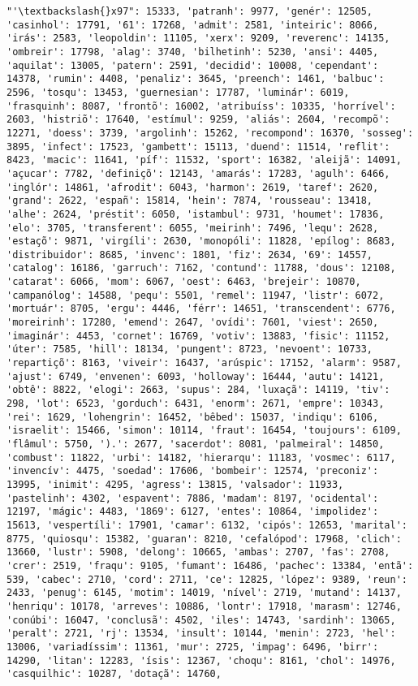 \begin{Verbatim}[commandchars=\\\{\}]
"'\textbackslash{}x97": 15333, 'patranh': 9977, 'genér': 12505, 'casinhol': 17791, '61': 17268, 'admit': 2581, 'inteiric': 8066, 'irás': 2583, 'leopoldin': 11105, 'xerx': 9209, 'reverenc': 14135, 'ombreir': 17798, 'alag': 3740, 'bilhetinh': 5230, 'ansi': 4405, 'aquilat': 13005, 'patern': 2591, 'decidid': 10008, 'cependant': 14378, 'rumin': 4408, 'penaliz': 3645, 'preench': 1461, 'balbuc': 2596, 'tosqu': 13453, 'guernesian': 17787, 'luminár': 6019, 'frasquinh': 8087, 'frontõ': 16002, 'atribuíss': 10335, 'horrível': 2603, 'histriõ': 17640, 'estímul': 9259, 'aliás': 2604, 'recompõ': 12271, 'doess': 3739, 'argolinh': 15262, 'recompond': 16370, 'sosseg': 3895, 'infect': 17523, 'gambett': 15113, 'duend': 11514, 'reflit': 8423, 'macic': 11641, 'píf': 11532, 'sport': 16382, 'aleijã': 14091, 'açucar': 7782, 'definiçõ': 12143, 'amarás': 17283, 'agulh': 6466, 'inglór': 14861, 'afrodit': 6043, 'harmon': 2619, 'taref': 2620, 'grand': 2622, 'españ': 15814, 'hein': 7874, 'rousseau': 13418, 'alhe': 2624, 'préstit': 6050, 'istambul': 9731, 'houmet': 17836, 'elo': 3705, 'transferent': 6055, 'meirinh': 7496, 'lequ': 2628, 'estaçõ': 9871, 'virgíli': 2630, 'monopóli': 11828, 'epílog': 8683, 'distribuidor': 8685, 'invenc': 1801, 'fiz': 2634, '69': 14557, 'catalog': 16186, 'garruch': 7162, 'contund': 11788, 'dous': 12108, 'catarat': 6066, 'mom': 6067, 'oest': 6463, 'brejeir': 10870, 'campanólog': 14588, 'pequ': 5501, 'remel': 11947, 'listr': 6072, 'mortuár': 8705, 'ergu': 4446, 'férr': 14651, 'transcendent': 6776, 'moreirinh': 17280, 'emend': 2647, 'ovídi': 7601, 'viest': 2650, 'imaginár': 4453, 'cornet': 16769, 'votiv': 13883, 'fisic': 11152, 'úter': 7585, 'hill': 18134, 'pungent': 8723, 'nevoent': 10733, 'repartiçõ': 8163, 'viveir': 16437, 'arúspic': 17152, 'alarm': 9587, 'ajust': 6749, 'envenen': 6093, 'holloway': 16444, 'autu': 14121, 'obtê': 8822, 'elogi': 2663, 'supus': 284, 'luxaçã': 14119, 'tiv': 298, 'lot': 6523, 'gorduch': 6431, 'enorm': 2671, 'empre': 10343, 'rei': 1629, 'lohengrin': 16452, 'bêbed': 15037, 'indiqu': 6106, 'israelit': 15466, 'simon': 10114, 'fraut': 16454, 'toujours': 6109, 'flâmul': 5750, ').': 2677, 'sacerdot': 8081, 'palmeiral': 14850, 'combust': 11822, 'urbi': 14182, 'hierarqu': 11183, 'vosmec': 6117, 'invencív': 4475, 'soedad': 17606, 'bombeir': 12574, 'preconiz': 13995, 'inimit': 4295, 'agress': 13815, 'valsador': 11933, 'pastelinh': 4302, 'espavent': 7886, 'madam': 8197, 'ocidental': 12197, 'mágic': 4483, '1869': 6127, 'entes': 10864, 'impolidez': 15613, 'vespertíli': 17901, 'camar': 6132, 'cipós': 12653, 'marital': 8775, 'quiosqu': 15382, 'guaran': 8210, 'cefalópod': 17968, 'clich': 13660, 'lustr': 5908, 'delong': 10665, 'ambas': 2707, 'fas': 2708, 'crer': 2519, 'fraqu': 9105, 'fumant': 16486, 'pachec': 13384, 'entã': 539, 'cabec': 2710, 'cord': 2711, 'ce': 12825, 'lópez': 9389, 'reun': 2433, 'penug': 6145, 'motim': 14019, 'nível': 2719, 'mutand': 14137, 'henriqu': 10178, 'arreves': 10886, 'lontr': 17918, 'marasm': 12746, 'conúbi': 16047, 'conclusã': 4502, 'iles': 14743, 'sardinh': 13065, 'peralt': 2721, 'rj': 13534, 'insult': 10144, 'menin': 2723, 'hel': 13006, 'variadíssim': 11361, 'mur': 2725, 'impag': 6496, 'birr': 14290, 'litan': 12283, 'ísis': 12367, 'choqu': 8161, 'chol': 14976, 'casquilhic': 10287, 'dotaçã': 14760, 
\end{Verbatim}
